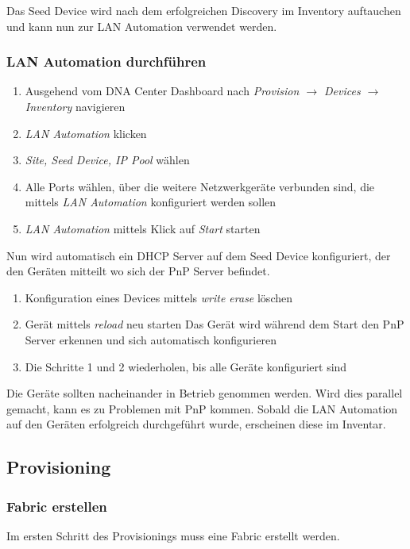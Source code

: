 Das Seed Device wird nach dem erfolgreichen Discovery im Inventory auftauchen und kann nun zur LAN Automation verwendet werden.

\subsubsection{LAN Automation durchführen}
\begin{enumerate}
	\item Ausgehend vom DNA Center Dashboard nach \textit{Provision $\rightarrow$ Devices $\rightarrow$ Inventory} navigieren
	\item \textit{LAN Automation} klicken
	\item \textit{Site, Seed Device, IP Pool} wählen
	\item Alle Ports wählen, über die weitere Netzwerkgeräte verbunden sind, die mittels \textit{LAN Automation} konfiguriert werden sollen
	\item \textit{LAN Automation} mittels Klick auf \textit{Start} starten
\end{enumerate}

Nun wird automatisch ein DHCP Server auf dem Seed Device konfiguriert, der den Geräten mitteilt wo sich der PnP Server befindet.

\begin{enumerate}
	\item Konfiguration eines Devices mittels \textit{write erase} löschen
	\item Gerät mittels \textit{reload} neu starten
	\subitem Das Gerät wird während dem Start den PnP Server erkennen und sich automatisch konfigurieren
	\item Die Schritte 1 und 2 wiederholen, bis alle Geräte konfiguriert sind
\end{enumerate}

Die Geräte sollten nacheinander in Betrieb genommen werden. Wird dies parallel gemacht, kann es zu Problemen mit PnP kommen.
Sobald die LAN Automation auf den Geräten erfolgreich durchgeführt wurde, erscheinen diese im Inventar.

\subsection{Provisioning}
\subsubsection{Fabric erstellen}
Im ersten Schritt des Provisionings muss eine Fabric erstellt werden. 


